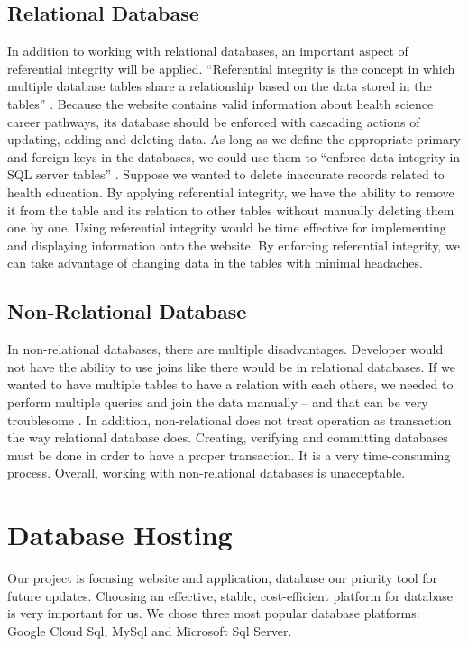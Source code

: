 \documentclass[letterpaper,10pt, draftclsnofoot,onecolumn]{IEEEtran}
\begin{document}
{{\subsection[Relational Database]{\color{black}
Relational Database}
{\color{black}\normalsize\noindent
{In addition to working with relational databases, an important aspect of referential integrity will be applied. 
“Referential integrity is the concept in which multiple database tables share a relationship based on the data stored in the tables” \cite{IEEEexample:article1}. 
Because the website contains valid information about health science career pathways, its database should be enforced with cascading actions of updating, adding and deleting data. 
As long as we define the appropriate primary and foreign keys in the databases, we could use them to “enforce data integrity in SQL server tables” \cite{IEEEexample:article2}. 
Suppose we wanted to delete inaccurate records related to health education.
By applying referential integrity, we have the ability to remove it from the table and its relation to other tables without manually deleting them one by one. 
Using referential integrity would be time effective for implementing and displaying information onto the website. 
By enforcing referential integrity, we can take advantage of changing data in the tables with minimal headaches. 
}



\subsection[Non-Relational Database]{\color{black}
Non-Relational Database}
{\color{black}\normalsize\noindent
{In non-relational databases, there are multiple disadvantages. 
Developer would not have the ability to use joins like there would be in relational databases. 
If we wanted to have multiple tables to have a relation with each others, we needed to perform multiple queries and join the data manually – and that can be very troublesome \cite{IEEEexample:article}. 
In addition, non-relational does not treat operation as transaction the way relational database does. 
Creating, verifying and committing databases must be done in order to have a proper transaction. 
It is a very time-consuming process. 
Overall, working with non-relational databases is unacceptable. 
}


\section[Database Hosting]{\color{black}
Database Hosting}
\noindent Our project is focusing website and application, database our priority tool for future updates. Choosing an effective, stable, cost-efficient platform for database is very important for us. We chose three most popular database platforms: Google Cloud Sql, MySql and Microsoft Sql Server. 

}}}}
\end{document}
